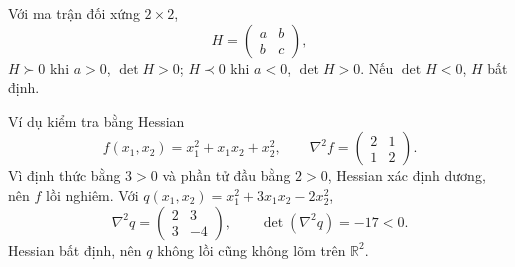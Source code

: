 \documentclass[11pt,a4paper]{article}
\newcommand{\R}{\mathbb{R}}
\newcommand{\Hess}{\nabla^2}
\begin{document}
Với ma trận đối xứng \(2\times2\),
\[
H=\begin{pmatrix}a&b\\b&c\end{pmatrix},
\]
\(H\succ0\) khi \(a>0\), \(\det H>0\); \(H\prec0\) khi \(a<0\), \(\det H>0\). Nếu \(\det H<0\), \(H\) bất định.

\begin{exbox}{Ví dụ kiểm tra bằng Hessian}
\[
f(x_1,x_2)=x_1^2+x_1x_2+x_2^2,\qquad
\Hess f=\begin{pmatrix}2&1\\1&2\end{pmatrix}.
\]
Vì định thức bằng \(3>0\) và phần tử đầu bằng \(2>0\), Hessian xác định dương, nên \(f\) lồi nghiêm.
Với \(q(x_1,x_2)=x_1^2+3x_1x_2-2x_2^2\),
\[
\Hess q=\begin{pmatrix}2&3\\3&-4\end{pmatrix},\qquad
\det(\Hess q)=-17<0.
\]
Hessian bất định, nên \(q\) không lồi cũng không lõm trên \(\R^2\).
\end{exbox}
\end{document}
